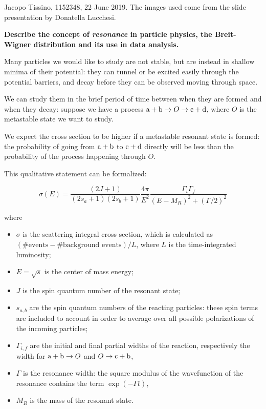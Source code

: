 \documentclass[10pt]{article}
\begin{document}

Jacopo Tissino, 1152348, 22 June 2019. The images used come from the slide presentation by Donatella Lucchesi.

\textbf{Describe the concept of \emph{resonance} in particle physics, the Breit-Wigner distribution and its use in data analysis.}

Many particles we would like to study are not stable, but are instead in shallow
minima of their potential: they can tunnel or be excited easily through the potential barriers, and decay before they can be observed moving through space.

We can study them in the brief period of time between when they are formed and when
they decay: suppose we have a process \(\ce{a} + \ce{b} \rightarrow O \rightarrow \ce{c} + \ce{d} \), where \(O\) is the metastable state we want to study.

We expect the cross section to be higher if a metastable resonant state is formed: the probability of going from \(\ce{a}  + \ce{b}  \) to \(\ce{c} + \ce{d} \) directly will be less than the probability of the process happening through \(O\).

This qualitative statement can be formalized:

\begin{equation} \label{eq:breit-wigner}
    \sigma(E)  =
    \frac{(2J+1)}{(2s_a + 1) (2s_b + 1)} \frac{4 \pi }{E^2}
    \frac{\Gamma_i \Gamma_f}{(E-M_R)^2 + (\Gamma/2)^2}
\end{equation}

where

\begin{itemize}
    \item \(\sigma\) is the scattering integral cross section, which is calculated as \((\#\text{events} - \#\text{background events})/ L\), where \(L\) is the time-integrated luminosity;
    \item \(E = \sqrt{s} \) is the center of mass energy;
    \item \(J\) is the spin quantum number of the resonant state;
    \item \(s_{a, b}\) are the spin quantum numbers of the reacting particles: these spin terms are included to account in order to average over all possible polarizations of the incoming particles;
    \item \(\Gamma_{i,f}\) are the initial and final partial widths of the reaction, respectively the width for \(\ce{a} + \ce{b} \rightarrow O\) and \(O \rightarrow \ce{c} + \ce{b} \),
    \item \(\Gamma\) is the resonance width: the square modulus of the wavefunction of the resonance contains the term \(\exp(- \Gamma t) \),
    \item \(M_R\) is the mass of the resonant state.
\end{itemize}
\end{document}
